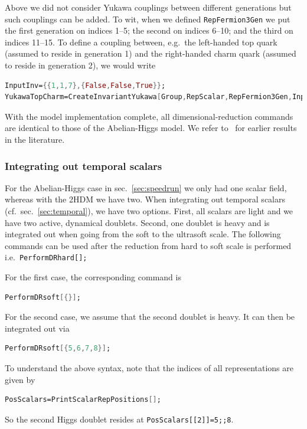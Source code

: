 \documentclass[11pt]{article}
\begin{document}
Above we did not consider Yukawa couplings between different generations but
such couplings can be added.
To wit, when we defined {\tt RepFermion3Gen} we put the first generation
on indices 1--5; the second
on indices 6--10; and the third
on indices 11--15.
To define a coupling between, e.g.\
the left-handed top quark (assumed to reside in generation 1) and
the right-handed charm quark (assumed to reside in generation 2),
we would write
\begin{lstlisting}[language=Mathematica,mathescape=true]
InputInv={{1,1,7},{False,False,True}};
YukawaTopCharm=CreateInvariantYukawa[Group,RepScalar,RepFermion3Gen,InputInv]//Simplify;
\end{lstlisting}
With the model implementation complete,
all dimensional-reduction commands are identical to those of the Abelian-Higgs model.
We refer to~\cite{Losada:1996ju,Andersen:1998br,Gorda:2018hvi}
for earlier results in the literature.

%
\subsubsection*{Integrating out temporal scalars}

For the Abelian-Higgs case in sec.~\ref{sec:speedrun} we only had one scalar field,
whereas with the 2HDM we have two.
When integrating out temporal scalars (cf.\ sec.~\ref{sec:temporal}),
we have two options.
First, all scalars are light and we have two active, dynamical doublets.
Second, one doublet is heavy and is integrated out when going from
the soft to
the ultrasoft scale.
The following commands can be used after
the reduction from hard to soft scale is performed i.e.\
{\tt PerformDRhard[];}


For the first case,
the corresponding command is
\begin{lstlisting}[language=Mathematica,mathescape=true]
PerformDRsoft[{}];
\end{lstlisting}
For the second case,
we assume that the second doublet is heavy.
It can then be integrated out via
\begin{lstlisting}[language=Mathematica,mathescape=true]
PerformDRsoft[{5,6,7,8}];
\end{lstlisting}
To understand the above syntax,
note that the indices of all representations are given by
\begin{lstlisting}[language=Mathematica,mathescape=true]
PosScalars=PrintScalarRepPositions[];
\end{lstlisting}
So the second Higgs doublet resides at {\tt PosScalars[[2]]=5;;8}.
\end{document}
